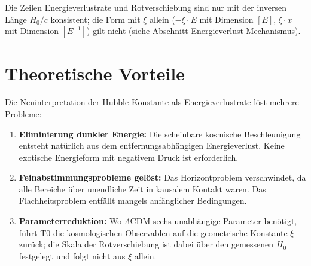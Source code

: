 	\begin{center}
	\end{center}
	Die Zeilen Energieverlustrate und Rotverschiebung sind nur mit der inversen Länge $H_0/c$ konsistent; die Form mit $\xi$ allein ($-\xi \cdot E$ mit Dimension $[E]$, $\xi \cdot x$ mit Dimension $[E^{-1}]$) gilt nicht (siehe Abschnitt Energieverlust-Mechanismus).

\section{Theoretische Vorteile}

	Die Neuinterpretation der Hubble-Konstante als Energieverlustrate löst mehrere Probleme:

	\begin{enumerate}
		\item \textbf{Eliminierung dunkler Energie:} Die scheinbare kosmische Beschleunigung entsteht natürlich aus dem entfernungsabhängigen Energieverlust. Keine exotische Energieform mit negativem Druck ist erforderlich.

		\item \textbf{Feinabstimmungsprobleme gelöst:} Das Horizontproblem verschwindet, da alle Bereiche über unendliche Zeit in kausalem Kontakt waren. Das Flachheitsproblem entfällt mangels anfänglicher Bedingungen.

		\item \textbf{Parameterreduktion:} Wo $\Lambda$CDM sechs unabhängige Parameter benötigt, führt T0 die kosmologischen Observablen auf die geometrische Konstante $\xi$ zurück; die Skala der Rotverschiebung ist dabei über den gemessenen $H_0$ festgelegt und folgt nicht aus $\xi$ allein.
	\end{enumerate}

